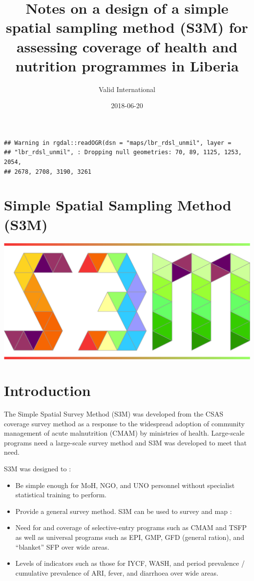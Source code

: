 \documentclass[12pt,a4paper]{book}
\title{Notes on a design of a simple spatial sampling method (S3M) for
assessing coverage of health and nutrition programmes in Liberia}
\author{Valid International}
\date{2018-06-20}
\theoremstyle{definition}
\theoremstyle{definition}
\theoremstyle{definition}
\theoremstyle{remark}
\begin{document}
\maketitle

{
\hypersetup{linkcolor=black}
\setcounter{tocdepth}{1}
\tableofcontents
}
\begin{verbatim}
## Warning in rgdal::readOGR(dsn = "maps/lbr_rdsl_unmil", layer =
## "lbr_rdsl_unmil", : Dropping null geometries: 70, 89, 1125, 1253, 2054,
## 2678, 2708, 3190, 3261
\end{verbatim}

\hypertarget{simple-spatial-sampling-method-s3m}{%
\chapter*{Simple Spatial Sampling Method
(S3M)}\label{simple-spatial-sampling-method-s3m}}

\includegraphics{figures/s3mlogo.png}

\hypertarget{introduction}{%
\chapter{Introduction}\label{introduction}}

The Simple Spatial Survey Method (S3M) was developed from the CSAS
coverage survey method as a response to the widespread adoption of
community management of acute malnutrition (CMAM) by ministries of
health. Large-scale programs need a large-scale survey method and S3M
was developed to meet that need.

S3M was designed to :

\begin{itemize}
\item
  Be simple enough for MoH, NGO, and UNO personnel without specialist
  statistical training to perform.
\item
  Provide a general survey method. S3M can be used to survey and map :
\item
  Need for and coverage of selective-entry programs such as CMAM and
  TSFP as well as universal programs such as EPI, GMP, GFD (general
  ration), and ``blanket'' SFP over wide areas.
\item
  Levels of indicators such as those for IYCF, WASH, and period
  prevalence / cumulative prevalence of ARI, fever, and diarrhoea over
  wide areas.
\end{itemize}
\end{document}
